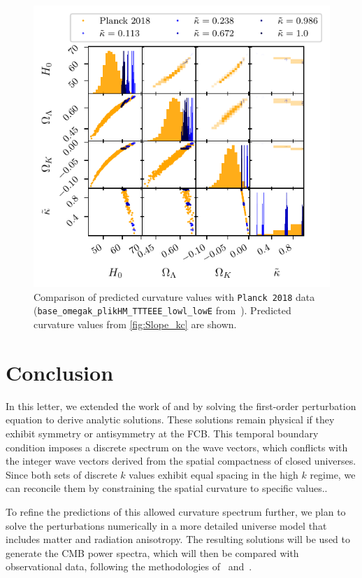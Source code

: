 \documentclass[%
 reprint,
 amsmath,amssymb,
 prl,
]{revtex4-2}
\begin{document}
\begin{figure}
     \includegraphics{Planck_kappa.pdf}
     \caption{Comparison of predicted curvature values with \texttt{Planck 2018} data (\texttt{base\_omegak\_plikHM\_TTTEEE\_lowl\_lowE} from~\cite{2020A&A...641A...6P}). Predicted curvature values from \cref{fig:Slope_kc} are shown.}
     \label{fig:Planck_kappa}
\end{figure}

\section{Conclusion} 
In this letter, we extended the work of \citet{2022PhRvD.105h3514L} and \citet{2021arXiv210906204B} by solving the first-order perturbation equation to derive analytic solutions. These solutions remain physical if they exhibit symmetry or antisymmetry at the FCB. This temporal boundary condition imposes a discrete spectrum on the wave vectors, which conflicts with the integer wave vectors derived from the spatial compactness of closed universes. Since both sets of discrete \(k\) values exhibit equal spacing in the high \(k\) regime, we can reconcile them by constraining the spatial curvature to specific values.. 

To refine the predictions of this allowed curvature spectrum further, we plan to solve the perturbations numerically in a more detailed universe model that includes matter and radiation anisotropy. The resulting solutions will be used to generate the CMB power spectra, which will then be compared with observational data, following the methodologies of~\cite{2022PhRvD.105h3515B} and~\cite{2022PhRvD.105l3508P}.
\end{document}
